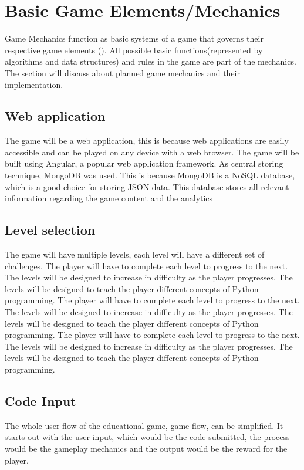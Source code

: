\section{Basic Game Elements/Mechanics}
Game Mechanics function as basic systems of a game that governs their respective game elements (\cite{adams2012game}). All possible basic functions(represented by algorithms and data structures) and rules in the game are part of the mechanics. The section will discuss about planned game mechanics and their implementation.

\subsection{Web application}
The game will be a web application, this is because web applications are easily accessible and can be played on any device with a web browser. The game will be built using Angular, a popular web application framework. As central storing technique, MongoDB was used. This is because MongoDB is a NoSQL database, which is a good choice for storing JSON data. This database stores all relevant information regarding the
game content and the analytics


\subsection{Level selection}
The game will have multiple levels, each level will have a different set of challenges. The player will have to complete each level to progress to the next. The levels will be designed to increase in difficulty as the player progresses. The levels will be designed to teach the player different concepts of Python programming. The player will have to complete each level to progress to the next. The levels will be designed to increase in difficulty as the player progresses. The levels will be designed to teach the player different concepts of Python programming. The player will have to complete each level to progress to the next. The levels will be designed to increase in difficulty as the player progresses. The levels will be designed to teach the player different concepts of Python programming.





\subsection{Code Input}
The whole user flow of the educational game, game flow\cite{kramarzewski2018practical}, can be simplified. It starts out with the user input, which would be the code submitted, the process would be the gameplay mechanics and the output would be the reward for the player. 

